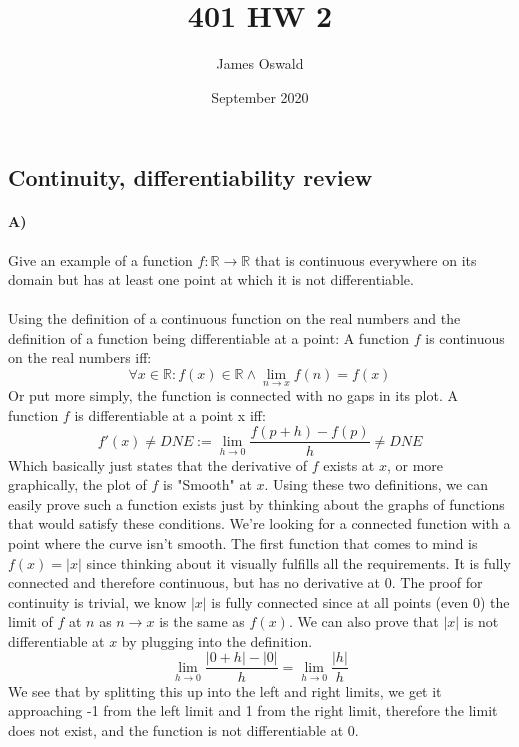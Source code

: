 \documentclass{article}
\title{401 HW 2}
\author{James Oswald}
\date{September 2020}
\begin{document}
\maketitle
\addtocounter{section}{2}

\subsection{Continuity, differentiability review}
\paragraph{A)}
Give an example of a function $f:\mathbb{R}\to\mathbb{R}$ that is continuous everywhere on its domain but has at least one point at which it is not differentiable.
\paragraph{}
Using the definition of a continuous function on the real numbers and the definition of a function being differentiable at a point:
\newline\newline
A function $f$ is continuous on the real numbers iff:
\[\forall x\in\mathbb{R}:f(x)\in\mathbb{R}\wedge\lim_{n\to x}f(n) = f(x)\]
Or put more simply, the function is connected with no gaps in its plot. A function $f$ is differentiable at a point x iff:
\[f'(x)\neq DNE := \lim_{h\to 0}\frac{f(p+h) - f(p)}{h}\neq DNE\]
Which basically just states that the derivative of $f$ exists at $x$, or more graphically, the plot of $f$ is "Smooth" at $x$. Using these two definitions, we can easily prove such a function exists just by thinking about the graphs of functions that would satisfy these conditions. We're looking for a connected function with a point where the curve isn't smooth. The first function that comes to mind is $f(x) = |x|$ since thinking about it visually fulfills all the requirements. It is fully connected and therefore continuous, but has no derivative at 0. The proof for continuity is trivial, we know $|x|$ is fully connected since at all points (even 0) the limit of $f$ at $n$  as $n \to x$ is the same as $f(x)$. We can also prove that $|x|$ is not differentiable at $x$ by plugging into the definition. 
\[\lim_{h\to 0}\frac{|0+h| - |0|}{h} = \lim_{h\to 0}\frac{|h|}{h}\]
We see that by splitting this up into the left and right limits, we get it approaching -1 from the left limit and 1 from the right limit, therefore the limit does not exist, and the function is not differentiable at 0.
\newpage
\end{document}
